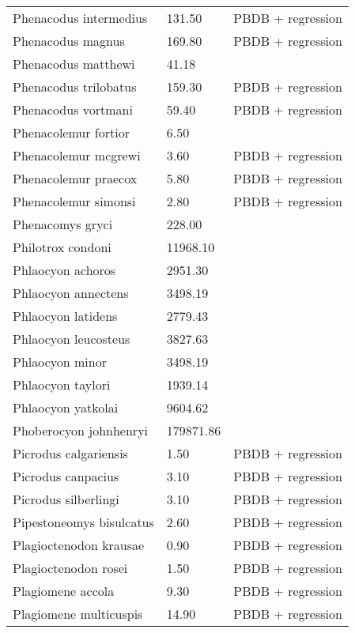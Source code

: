 \documentclass{article}
\begin{document}
\begin{center}
\begin{longtable}{p{} p{} p{}}
    Phenacodus intermedius & 131.50 & PBDB + regression \\ 
    Phenacodus magnus & 169.80 & PBDB + regression \\ 
    Phenacodus matthewi & 41.18 & \cite{Cope1871} \\ 
    Phenacodus trilobatus & 159.30 & PBDB + regression \\ 
    Phenacodus vortmani & 59.40 & PBDB + regression \\ 
    Phenacolemur fortior & 6.50 & \cite{Wood1962} \\ 
    Phenacolemur mcgrewi & 3.60 & PBDB + regression \\ 
    Phenacolemur praecox & 5.80 & PBDB + regression \\ 
    Phenacolemur simonsi & 2.80 & PBDB + regression \\ 
    Phenacomys gryci & 228.00 & \cite{McKenna2011} \\ 
    Philotrox condoni & 11968.10 & \cite{Tomiya2013} \\ 
    Phlaocyon achoros & 2951.30 & \cite{Tomiya2013} \\ 
    Phlaocyon annectens & 3498.19 & \cite{Tomiya2013} \\ 
    Phlaocyon latidens & 2779.43 & \cite{Tomiya2013} \\ 
    Phlaocyon leucosteus & 3827.63 & \cite{Tomiya2013} \\ 
    Phlaocyon minor & 3498.19 & \cite{Tomiya2013} \\ 
    Phlaocyon taylori & 1939.14 & \cite{Tomiya2013} \\ 
    Phlaocyon yatkolai & 9604.62 & \cite{Tomiya2013} \\ 
    Phoberocyon johnhenryi & 179871.86 & \cite{Tomiya2013} \\ 
    Picrodus calgariensis & 1.50 & PBDB + regression \\ 
    Picrodus canpacius & 3.10 & PBDB + regression \\ 
    Picrodus silberlingi & 3.10 & PBDB + regression \\ 
    Pipestoneomys bisulcatus & 2.60 & PBDB + regression \\ 
    Plagioctenodon krausae & 0.90 & PBDB + regression \\ 
    Plagioctenodon rosei & 1.50 & PBDB + regression \\ 
    Plagiomene accola & 9.30 & PBDB + regression \\ 
    Plagiomene multicuspis & 14.90 & PBDB + regression \\ 

\end{longtable}
\end{center}
\end{document}
